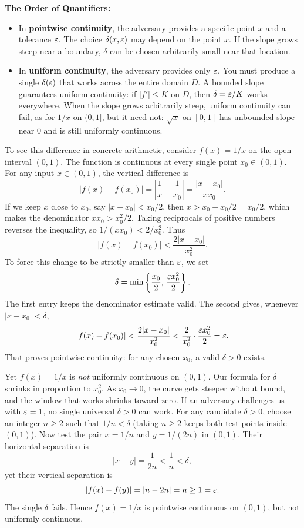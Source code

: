 \begin{intuitionbox}
\textbf{The Order of Quantifiers:}
\begin{itemize}
  \item In \textbf{pointwise continuity}, the adversary provides a specific point $x$ and a tolerance $\varepsilon$. The choice $\delta(x, \varepsilon)$ may depend on the point $x$. If the slope grows steep near a boundary, $\delta$ can be chosen arbitrarily small near that location.
  \item In \textbf{uniform continuity}, the adversary provides only $\varepsilon$. You must produce a single $\delta(\varepsilon)$ that works across the entire domain $D$. A bounded slope guarantees uniform continuity: if $|f'| \le K$ on $D$, then $\delta = \varepsilon/K$ works everywhere. When the slope grows arbitrarily steep, uniform continuity can fail, as for $1/x$ on $(0, 1]$, but it need not: $\sqrt{x}$ on $[0, 1]$ has unbounded slope near $0$ and is still uniformly continuous.
\end{itemize}
\end{intuitionbox}

To see this difference in concrete arithmetic, consider $f(x) = 1/x$ on the open interval $(0, 1)$. The function is continuous at every single point $x_0 \in (0, 1)$. For any input $x \in (0, 1)$, the vertical difference is
\[
|f(x) - f(x_0)| = \left|\frac{1}{x} - \frac{1}{x_0}\right| = \frac{|x - x_0|}{x x_0}.
\]
If we keep $x$ close to $x_0$, say $|x - x_0| < x_0/2$, then $x > x_0 - x_0/2 = x_0/2$, which makes the denominator $x x_0 > x_0^2/2$. Taking reciprocals of positive numbers reverses the inequality, so $1/(x x_0) < 2/x_0^2$. Thus
\[
|f(x) - f(x_0)| < \frac{2|x - x_0|}{x_0^2}.
\]
To force this change to be strictly smaller than $\varepsilon$, we set
\[
\delta = \min\left\{\frac{x_0}{2}, \, \frac{\varepsilon x_0^2}{2}\right\}.
\]
The first entry keeps the denominator estimate valid. The second gives, whenever $|x - x_0| < \delta$,
\[
|f(x) - f(x_0)| < \frac{2|x - x_0|}{x_0^2} < \frac{2}{x_0^2} \cdot \frac{\varepsilon x_0^2}{2} = \varepsilon.
\]
That proves pointwise continuity: for any chosen $x_0$, a valid $\delta > 0$ exists.

Yet $f(x) = 1/x$ is \emph{not} uniformly continuous on $(0, 1)$. Our formula for $\delta$ shrinks in proportion to $x_0^2$. As $x_0 \to 0$, the curve gets steeper without bound, and the window that works shrinks toward zero. If an adversary challenges us with $\varepsilon = 1$, no single universal $\delta > 0$ can work. For any candidate $\delta > 0$, choose an integer $n \ge 2$ such that $1/n < \delta$ (taking $n \ge 2$ keeps both test points inside $(0, 1)$). Now test the pair $x = 1/n$ and $y = 1/(2n)$ in $(0, 1)$. Their horizontal separation is
\[
|x - y| = \frac{1}{2n} < \frac{1}{n} < \delta,
\]
yet their vertical separation is
\[
|f(x) - f(y)| = |n - 2n| = n \ge 1 = \varepsilon.
\]
The single $\delta$ fails. Hence $f(x) = 1/x$ is pointwise continuous on $(0, 1)$, but not uniformly continuous.

